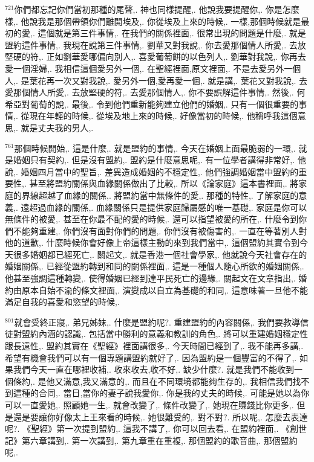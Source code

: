 \documentclass{book}
\begin{document}
$^{721}$你們都忘記你們當初那種的尾聲,.
神也同樣提醒,.
他說我要提醒你,.
你是怎麼樣,.
他說我是那個帶領你們離開埃及,.
你從埃及上來的時候,.
一樣,那個時候就是最初的愛,.
這個就是第三件事情,.
在我們的關係裡面,.
很常出現的問題是什麼,.
就是盟約這件事情,.
我現在說第三件事情,.
劉華又對我說,.
你去愛那個情人所愛,.
去放堅硬的符,.
正如劉華愛哪偏向別人,.
喜愛葡萄餅的以色列人,.
劉華對我說,.
你再去愛一個淫婦,.
我相信這個愛另外一個,.
在聖經裡面,原文裡面,.
不是去愛另外一個人,.
是葉花再一次又對我說,.
愛另外一個,愛再愛一個,.
就是講,.
葉花又對我說,.
去愛那個情人所愛,.
去放堅硬的符,.
去愛那個情人,.
你不要誤解這件事情,.
然後,.
何希亞對葡萄的說,.
最後,.
令到他們重新能夠建立他們的婚姻,.
只有一個很重要的事情,.
從現在年輕的時候,.
從埃及地上來的時候,.
好像當初的時候,.
他稱呼我這個意思,.
就是丈夫我的男人,.

$^{761}$那個時候開始,.
這是什麼,.
就是盟約的事情,.
今天在婚姻上面最脆弱的一環,.
就是婚姻只有契約,.
但是沒有盟約,.
盟約是什麼意思呢,.
有一位學者講得非常好,.
他說,.
婚姻四月當中的聖旨,.
差異造成婚姻的不穩定性,.
他們強調婚姻當中盟約的重要性,.
甚至將盟約關係與血緣關係做出了比較,.
所以《論家庭》這本書裡面,.
將家庭的界線超越了血緣的關係,.
將盟約當中無條件的愛,.
那種的特性,.
了解家庭的意義,.
遠超過血緣的關係,.
血緣關係只是提供家庭歸屬感的唯一基礎,.
家庭是你可以無條件的被愛,.
甚至在你最不配的愛的時候,.
還可以指望被愛的所在,.
什麼令到你們不能夠重建,.
你們沒有面對你們的問題,.
你們沒有被傷害的,.
一直在等著別人對他的道歉,.
什麼時候你會好像上帝這樣主動的來到我們當中,.
這個盟約其實令到今天很多婚姻都已經死亡,.
關起文,.
就是香港一個社會學家,.
他就說今天社會存在的婚姻關係,.
已經從盟約轉到和同的關係裡面,.
這是一種個人隨心所欲的婚姻關係,.
他甚至強調這種轉變,.
使得婚姻已經到達平民死亡的邊緣,.
關起文在文章指出,.
婚約由原本自始不渝的條文裡面,.
演變成以自立為基礎的和同,.
這意味著一旦他不能滿足自我的喜愛和慾望的時候,.

$^{801}$就會受終正寢,.
弟兄姊妹,.
什麼是盟約呢?.
重建盟約的內容關係,.
我們要教導信徒對盟約內涵的認識,.
包括當中勝利的意義和教訓的角色,.
將可以重建婚姻穩定性跟長遠性,.
盟約其實在《聖經》裡面講很多,.
今天時間已經到了,.
我不能再多講,.
希望有機會我們可以有一個專題講盟約就好了,.
因為盟約是一個豐富的不得了,.
如果我們今天一直在哪裡收補,.
收來收去,收不好,.
缺少什麼?.
就是我們不能收到一個條約,.
是他又滿意,我又滿意的,.
而且在不同環境都能夠生存的,.
我相信我們找不到這種的合同,.
當日,當你的妻子說我愛你,.
你是我的丈夫的時候,.
可能是她以為你可以一直愛她,.
照顧她一生,.
就會改變了,.
條件改變了,.
她現在賺錢比你更多,.
但是還是要讓你好像太上王來看的時候,.
她很難受的,.
對不對?.
所以呢,.
怎麼去表達呢?.
《聖經》第一次提到盟約,.
這我不講了,.
你可以回去看,.
在盟約裡面,.
《創世記》第六章講到,.
第一次講到,.
第九章重在重複,.
那個盟約的歌音曲,.
那個盟約呢,.
\end{document}
